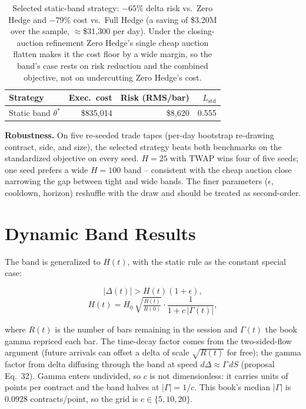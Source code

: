 \documentclass[11pt]{article}
\begin{document}
\begin{table}[htbp]
\centering
\small
\begin{tabular}{lrrr}
\toprule
\textbf{Strategy} & \textbf{Exec.\ cost} & \textbf{Risk (RMS/bar)} & $L_{\text{std}}$ \\
\midrule
Static band $\theta^{*}$ & \$835{,}014 & \$8{,}620 & 0.555 \\
\bottomrule
\end{tabular}
\caption{Selected static-band strategy: $-65\%$ delta risk vs.\ Zero Hedge and
$-79\%$ cost vs.\ Full Hedge (a saving of \$3.20M over the sample,
$\approx$\$31{,}300 per day). Under the closing-auction refinement Zero Hedge's single
cheap auction flatten makes it the cost floor by a wide margin, so the band's case
rests on risk reduction and the combined objective, not on undercutting Zero Hedge's
cost.}
\end{table}

\textbf{Robustness.} On five re-seeded trade tapes (per-day bootstrap re-drawing
contract, side, and size), the selected strategy beats both benchmarks on the
standardized objective on every seed. $H = 25$ with TWAP wins four of five seeds; one
seed prefers a wide $H = 100$ band -- consistent with the cheap auction close narrowing
the gap between tight and wide bands. The finer parameters ($\epsilon$, cooldown,
horizon) reshuffle with the draw and should be treated as second-order.

\section{Dynamic Band Results}

The band is generalized to $H(t)$, with the static rule as the constant special case:

\begin{eqbox}
\begin{equation}
\lvert \Delta(t) \rvert > H(t)(1+\epsilon),
\end{equation}
\begin{equation}
H(t) = H_0 \,\sqrt{\tfrac{R(t)}{R(0)}}
\cdot \frac{1}{1 + c\,\lvert\Gamma(t)\rvert},
\end{equation}
\end{eqbox}

where $R(t)$ is the number of bars remaining in the session and $\Gamma(t)$ the book
gamma repriced each bar. The time-decay factor comes from the two-sided-flow argument
(future arrivals can offset a delta of scale $\sqrt{R(t)}$ for free); the gamma factor
from delta diffusing through the band at speed $d\Delta \approx \Gamma\,dS$ (proposal
Eq.~32). Gamma enters undivided, so $c$ is not dimensionless: it carries units of points
per contract and the band halves at $\lvert\Gamma\rvert = 1/c$. This book's median
$\lvert\Gamma\rvert$ is $0.0928$ contracts/point, so the grid is $c \in \{5, 10, 20\}$.
\end{document}
